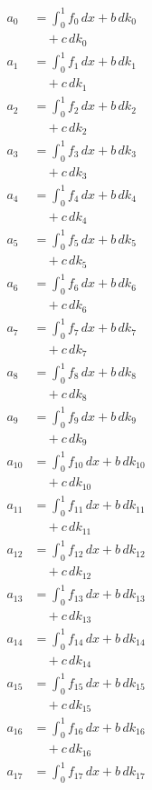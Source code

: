 \documentclass{article}
\begin{document}
\begin{align}
a_{0} &= \int_0^1 f_{0}\,dx + b\,dk_{0} \\
&\quad + c\,dk_{0} \\
a_{1} &= \int_0^1 f_{1}\,dx + b\,dk_{1} \\
&\quad + c\,dk_{1} \\
a_{2} &= \int_0^1 f_{2}\,dx + b\,dk_{2} \\
&\quad + c\,dk_{2} \\
a_{3} &= \int_0^1 f_{3}\,dx + b\,dk_{3} \\
&\quad + c\,dk_{3} \\
a_{4} &= \int_0^1 f_{4}\,dx + b\,dk_{4} \\
&\quad + c\,dk_{4} \\
a_{5} &= \int_0^1 f_{5}\,dx + b\,dk_{5} \\
&\quad + c\,dk_{5} \\
a_{6} &= \int_0^1 f_{6}\,dx + b\,dk_{6} \\
&\quad + c\,dk_{6} \\
a_{7} &= \int_0^1 f_{7}\,dx + b\,dk_{7} \\
&\quad + c\,dk_{7} \\
a_{8} &= \int_0^1 f_{8}\,dx + b\,dk_{8} \\
&\quad + c\,dk_{8} \\
a_{9} &= \int_0^1 f_{9}\,dx + b\,dk_{9} \\
&\quad + c\,dk_{9} \\
a_{10} &= \int_0^1 f_{10}\,dx + b\,dk_{10} \\
&\quad + c\,dk_{10} \\
a_{11} &= \int_0^1 f_{11}\,dx + b\,dk_{11} \\
&\quad + c\,dk_{11} \\
a_{12} &= \int_0^1 f_{12}\,dx + b\,dk_{12} \\
&\quad + c\,dk_{12} \\
a_{13} &= \int_0^1 f_{13}\,dx + b\,dk_{13} \\
&\quad + c\,dk_{13} \\
a_{14} &= \int_0^1 f_{14}\,dx + b\,dk_{14} \\
&\quad + c\,dk_{14} \\
a_{15} &= \int_0^1 f_{15}\,dx + b\,dk_{15} \\
&\quad + c\,dk_{15} \\
a_{16} &= \int_0^1 f_{16}\,dx + b\,dk_{16} \\
&\quad + c\,dk_{16} \\
a_{17} &= \int_0^1 f_{17}\,dx + b\,dk_{17} \\

\end{align}
\end{document}
